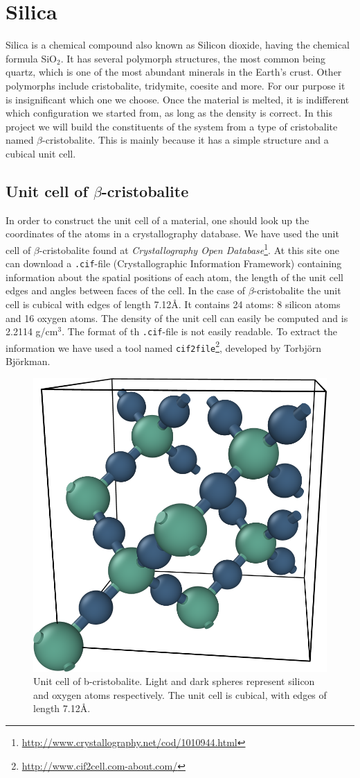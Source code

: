 \documentclass[twoside,english]{uiofysmaster}
\begin{document}
\section{Silica}
Silica is a chemical compound also known as Silicon dioxide, having the chemical formula SiO$_2$. It has several polymorph structures, the most common being quartz, which is one of the most abundant minerals in the Earth's crust. Other polymorphs include cristobalite, tridymite, coesite and more.    
For our purpose it is insignificant which one we choose. 
Once the material is melted, it is indifferent which configuration we started from, as long as the density is correct.
In this project we will build the constituents of the system from a type of cristobalite named $\beta$-cristobalite. This is mainly because it has a simple structure and a cubical unit cell.


\subsection{Unit cell of $\beta$-cristobalite}
In order to construct the unit cell of a material, one should look up the coordinates of the atoms in a crystallography database. We have used the unit cell of $\beta$-cristobalite found at \textit{Crystallography Open Database}\footnote{\href{http://www.crystallography.net/cod/1010944.html}{http://www.crystallography.net/cod/1010944.html}}. 
At this site one can download a \texttt{.cif}-file (Crystallographic Information Framework) containing information about the spatial positions of each atom, the length of the unit cell edges and angles between faces of the cell. 
In the case of $\beta$-cristobalite the unit cell is cubical with edges of length 7.12Å. 
It contains 24 atoms: 8 silicon atoms and 16 oxygen atoms. 
The density of the unit cell can easily be computed and is 2.2114 g/cm$^3$.
The format of th \texttt{.cif}-file is not easily readable. To extract the information we have used a tool named \texttt{cif2file}\footnote{\href{http://www.cif2cell.com-about.com/}{http://www.cif2cell.com-about.com/}}, developed by Torbjörn Björkman. 

\begin{figure}
	\centering
	\includegraphics[width=0.5\linewidth]{figures/unitcell/unitcell.png}
	\caption{Unit cell of b-cristobalite. Light and dark spheres represent silicon and oxygen atoms respectively. The unit cell is cubical, with edges of length 7.12Å.}
	\label{fig:unitcellbcristobalite}
\end{figure}
\end{document}
